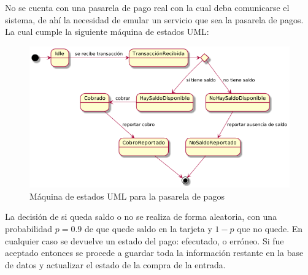 No se cuenta con una pasarela de pago real con la cual deba comunicarse el sistema, de ahí la necesidad de emular un servicio que sea la pasarela de pagos. La cual cumple la siguiente máquina de estados UML:

\begin{figure}[h!]
    \centering
    \includegraphics[width=13cm]{./chapters/img/pasarela.png}

    \label{fig:pasarela}
    \caption{Máquina de estados UML para la pasarela de pagos}
\end{figure}

La decisión de si queda saldo o no se realiza de forma aleatoria, con una probabilidad $p = 0.9$ de que quede saldo en la tarjeta y $1- p$ que no quede. En cualquier caso se devuelve un estado del pago: efecutado, o erróneo. Si fue aceptado entonces se procede a guardar toda la información restante en la base de datos y actualizar el estado de la compra de la entrada.
